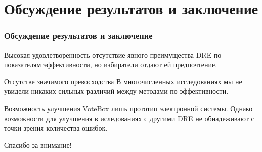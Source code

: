 \documentclass[11pt]{beamer}
\begin{document}
\section{Обсуждение результатов и заключение}

\begin{frame}
\frametitle{Обсуждение результатов и заключение}
    \begin{block}{Высокая удовлетворенность}
        \alert{отсутствие явного преимущества DRE} по показателям эффективности, но избиратели отдают ей предпочтение.
    \end{block}

    \begin{alertblock}{Отсутстве значимого превосходства}
        В многочисленных исследованиях \alert{мы не увидели никаких сильных различий} между методами по эффективности.
    \end{alertblock}
    
    \begin{alertblock}{Возможность улучшения}
        VoteBox лишь прототип электронной системы. Однако возможности для улучшения в иследованиях с другими DRE \alert{не обнадеживают} с точки зрения количества ошибок. 
    \end{alertblock}
\end{frame}

\begin{frame}
    \centering
    \Huge{\Huge\calligra Спасибо за внимание!}
\end{frame}
\end{document}
